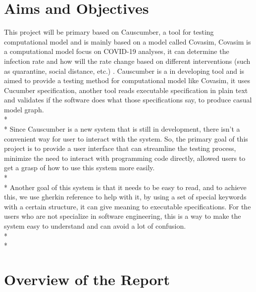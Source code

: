 \section{Aims and Objectives}

This project will be primary based on Causcumber, a tool for testing computational model and is mainly based on a model called Covasim, Covasim is a computational model focus on COVID-19 analyses, it can determine the infection rate and how will the rate change based on different interventions (such as quarantine, social distance, etc.) \cite{Reference3}. Causcumber is a in developing tool and is aimed to provide a testing method for computational model like Covasim, it uses Cucumber specification, another tool reads executable specification in plain text and validates if the software does what those specifications say, to produce casual model graph. \\*\\*
Since Causcumber is a new system that is still in development, there isn’t a convenient way for user to interact with the system. So, the primary goal of this project is to provide a user interface that can streamline the testing process, minimize the need to interact with programming code directly, allowed users to get a grasp of how to use this system more easily. \\*\\*
Another goal of this system is that it needs to be easy to read, and to achieve this, we use gherkin reference to help with it, by using a set of special keywords with a certain structure, it can give meaning to executable specifications. For the users who are not specialize in software engineering, this is a way to make the system easy to understand and can avoid a lot of confusion. \\*\\*



\section{Overview of the Report}

